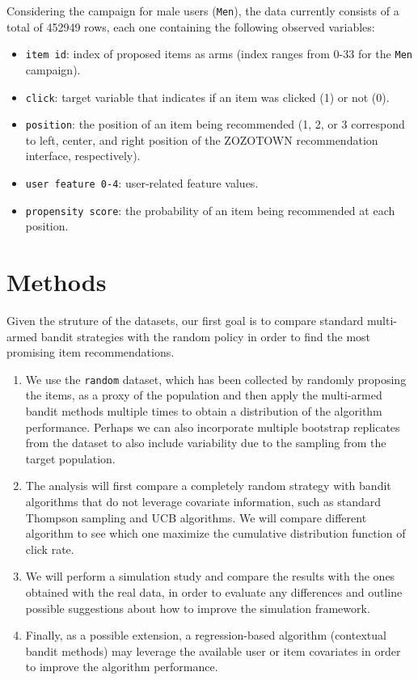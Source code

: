 \documentclass{article}
\begin{document}
Considering the campaign for male users (\texttt{Men}), the data currently consists of a total of 452949 rows, each one containing the following observed variables:
\begin{itemize}
    \item \texttt{item id}: index of proposed items as arms (index ranges from 0-33 for the \texttt{Men} campaign).
    \item \texttt{click}: target variable that indicates if an item was clicked (1) or not (0).
    \item \texttt{position}: the position of an item being recommended (1, 2, or 3 correspond to left, center, and right position of the ZOZOTOWN recommendation interface, respectively).
    \item  \texttt{user feature 0-4}: user-related feature values.
    \item \texttt{propensity score}: the probability of an item being recommended at each position.
\end{itemize}



\section{Methods}
Given the struture of the datasets, our first goal is to compare standard multi-armed bandit strategies with the random policy in order to find the most promising item recommendations.
\begin{enumerate}
    \item We use the \texttt{random} dataset, which has been collected by randomly proposing the items, as a proxy of the population and then apply the multi-armed bandit methods multiple times to obtain a distribution of the algorithm performance.
    Perhaps we can also incorporate multiple bootstrap replicates from the dataset to also include variability due to the sampling from the target population.
    
    \item  The analysis will first compare a completely random strategy with bandit algorithms that do not leverage covariate information, such as standard Thompson sampling and UCB algorithms. We will compare different algorithm to see which one maximize the cumulative distribution function of click rate.
    
    \item We will perform a simulation study and compare the results with the ones obtained with the real data, in order to evaluate any differences and outline possible suggestions about how to improve the simulation framework.
    
    
    \item Finally, as a possible extension, a regression-based algorithm (contextual bandit methods) may leverage the available user or item covariates in order to improve the algorithm performance. 
\end{enumerate}
\end{document}
